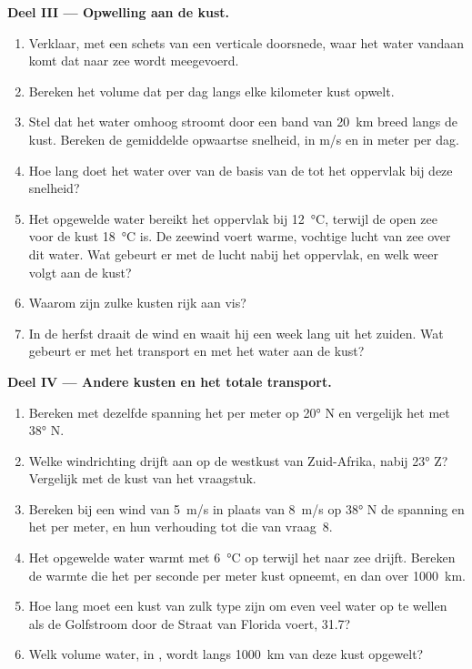 \begin{problem}
\medskip
\noindent\textbf{Deel III --- Opwelling aan de kust.}
\begin{enumerate}[resume]
  \item Verklaar, met een schets van een verticale doorsnede, waar het water vandaan komt dat naar zee wordt meegevoerd.
  \item Bereken het volume dat per dag langs elke kilometer kust opwelt.
  \item Stel dat het water omhoog stroomt door een band van \qty{20}{km} breed langs de kust. Bereken de gemiddelde opwaartse snelheid, in \unit{m/s} en in meter per dag.
  \item Hoe lang doet het water over van de basis van de  tot het oppervlak bij deze snelheid?
  \item Het opgewelde water bereikt het oppervlak bij \qty{12}{\celsius}, terwijl de open zee voor de kust \qty{18}{\celsius} is. De zeewind voert warme, vochtige lucht van zee over dit water. Wat gebeurt er met de lucht nabij het oppervlak, en welk weer volgt aan de kust?
  \item Waarom zijn zulke kusten rijk aan vis?
  \item In de herfst draait de wind en waait hij een week lang uit het zuiden. Wat gebeurt er met het transport en met het water aan de kust?
\end{enumerate}

\medskip
\noindent\textbf{Deel IV --- Andere kusten en het totale transport.}
\begin{enumerate}[resume]
  \item Bereken met dezelfde spanning het  per meter op \ang{20} N en vergelijk het met \ang{38} N.
  \item Welke windrichting drijft  aan op de westkust van Zuid-Afrika, nabij \ang{23} Z? Vergelijk met de kust van het vraagstuk.
  \item Bereken bij een wind van \qty{5}{m/s} in plaats van \qty{8}{m/s} op \ang{38} N de spanning en het  per meter, en hun verhouding tot die van vraag~8.
  \item Het opgewelde water warmt met \qty{6}{\celsius} op terwijl het naar zee drijft. Bereken de warmte die het per seconde per meter kust opneemt, en dan over \qty{1000}{km}.
  \item Hoe lang moet een kust van zulk type zijn om even veel water op te wellen als de Golfstroom door de Straat van Florida voert, \qty{31.7}{\sverdrup}?
  \item Welk volume water, in , wordt langs \qty{1000}{km} van deze kust opgewelt?
\end{enumerate}
\end{problem}
